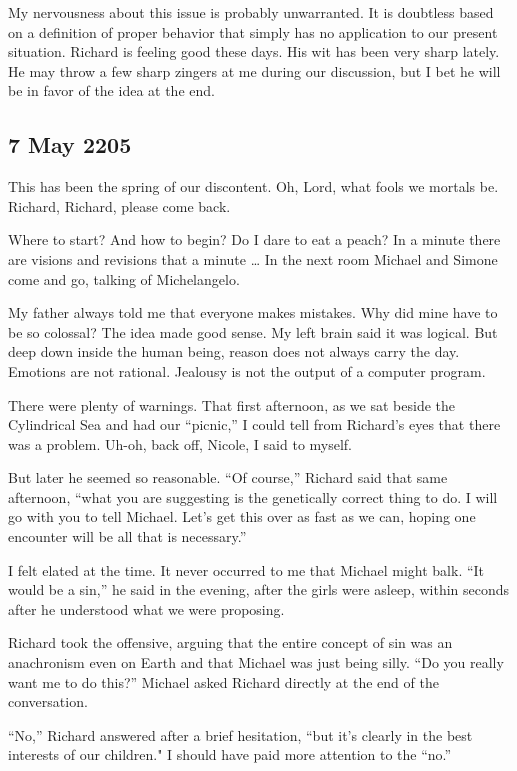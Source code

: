 \documentclass[]{article}
\begin{document}
My nervousness about this issue is probably unwarranted.  It is doubtless based on a definition of proper behavior that simply has no application to our present situation.  Richard is feeling good these days.  His wit has been very sharp lately.  He may throw a few sharp zingers at me during our discussion, but I bet he will be in favor of the idea at the end.

\subsection*{7 May 2205}

This has been the spring of our discontent.  Oh, Lord, what fools we mortals be.  Richard, Richard, please come back.

Where to start? And how to begin? Do I dare to eat a peach? In a minute there are visions and revisions that a minute … In the next room Michael and Simone come and go, talking of Michelangelo.

My father always told me that everyone makes mistakes.  Why did mine have to be so colossal? The idea made good sense.  My left brain said it was logical.  But deep down inside the human being, reason does not always carry the day.  Emotions are not rational.  Jealousy is not the output of a computer program.

There were plenty of warnings.  That first afternoon, as we sat beside the Cylindrical Sea and had our “picnic,” I could tell from Richard’s eyes that there was a problem.  Uh-oh, back off, Nicole, I said to myself.

But later he seemed so reasonable.  “Of course,” Richard said that same afternoon, “what you are suggesting is the genetically correct thing to do.  I will go with you to tell Michael.  Let’s get this over as fast as we can, hoping one encounter will be all that is necessary.”

I felt elated at the time.  It never occurred to me that Michael might balk.  “It would be a sin,” he said in the evening, after the girls were asleep, within seconds after he understood what we were proposing.

Richard took the offensive, arguing that the entire concept of sin was an anachronism even on Earth and that Michael was just being silly.  “Do you really want me to do this?” Michael asked Richard directly at the end of the conversation.

“No,” Richard answered after a brief hesitation, “but it’s clearly in the best interests of our children."  I should have paid more attention to the “no.”
\end{document}
